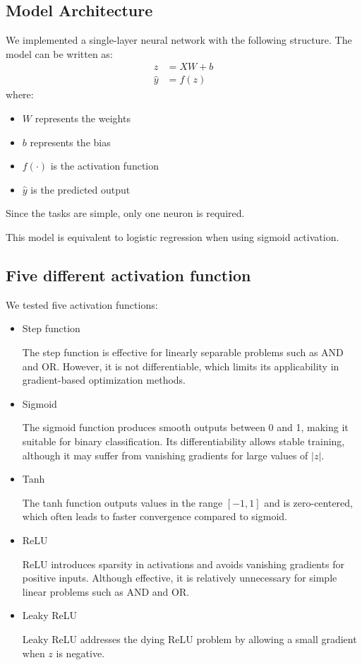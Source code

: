 \documentclass[11pt]{article}
\begin{document}
\subsection{Model Architecture}
We implemented a single-layer neural network with the following structure.
The model can be written as:
\begin{align}
z &= XW + b \label{eq:z_calc} \\
\hat{y} &= f(z) \label{eq:y_hat_calc}
\end{align}
where:
\begin{itemize}
    \item $W$ represents the weights
    \item $b$ represents the bias
    \item $f(\cdot)$ is the activation function
    \item $\hat{y}$ is the predicted output
\end{itemize}

Since the tasks are simple, only one neuron is required.

This model is equivalent to logistic regression when using sigmoid activation.


\subsection{Five different activation function}
We tested five activation functions:

\begin{itemize}
    \item Step function
    
The step function is effective for linearly separable problems such as AND and OR. However,
it is not differentiable, which limits its applicability in gradient-based optimization methods.
    \item Sigmoid
    
The sigmoid function produces smooth outputs between 0 and 1, making it suitable for binary
classification. Its differentiability allows stable training, although it may suffer from vanishing
gradients for large values of $|z|$.
    \item Tanh
    
    The tanh function outputs values in the range $[-1,1]$ and is zero-centered, which often leads
to faster convergence compared to sigmoid.
    \item ReLU
    

ReLU introduces sparsity in activations and avoids vanishing gradients for positive inputs.
Although effective, it is relatively unnecessary for simple linear problems such as AND and OR.
    \item Leaky ReLU
    


Leaky ReLU addresses the dying ReLU problem by allowing a small gradient when $z$ is negative.
\end{itemize}
\end{document}

